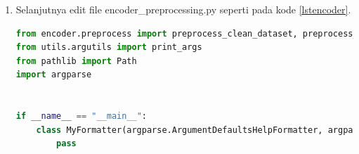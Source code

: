 \begin{enumerate}
\begin{lstlisting}[language=Python, caption=Preprocessing Function (Pycharm)]
            # Preprocess all speakers
        speaker_dirs = list(dataset_root.glob("*"))
        _preprocess_speaker_dirs(speaker_dirs, dataset_name, datasets_root, out_dir, "wav",
                                 skip_existing, logger)

#sama dengan diatas.
#catatan: jika teman-teman hanya menggunakan satu dataset maka hapus function ini, abaikan, atau komen.
#jika menggunakan tiga dataset maka tambahkan function ini dan sesuaikan dengan dataset teman-teman seperti cara di atas.

def preprocess_speech_dataset(datasets_root: Path, out_dir: Path, skip_existing=False):
    for dataset_name in titml_datasets["train"]["clean"]:
        # Initialize the preprocessing
        dataset_root, logger = _init_preprocess_dataset(dataset_name, datasets_root, out_dir)
        if not dataset_root:
            return

            # Preprocess all speakers
        speaker_dirs = list(dataset_root.glob("*"))
        _preprocess_speaker_dirs(speaker_dirs, dataset_name, datasets_root, out_dir, "wav",
                                 skip_existing, logger)
\end{lstlisting}

\item Selanjutnya edit file encoder\_preprocessing.py seperti pada kode \ref{lstencoder}.

\begin{lstlisting}[language=Python, caption=Preprocessing Encoder Model (Pycharm), label=lstencoder]
from encoder.preprocess import preprocess_clean_dataset, preprocess_speech_dataset
from utils.argutils import print_args
from pathlib import Path
import argparse


if __name__ == "__main__":
    class MyFormatter(argparse.ArgumentDefaultsHelpFormatter, argparse.RawDescriptionHelpFormatter):
        pass


\end{lstlisting}
\end{enumerate}
